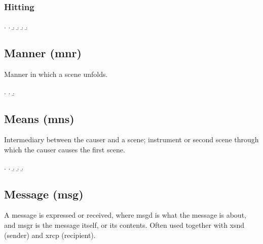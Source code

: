 \documentclass[a4paper]{article}
\begin{document}
\subsubsection{Hitting}

\ex.
\a. 
\b. 
\b. 
\b. 
\b. 


\clearpage
\subsection{Manner (\textsf{mnr})}
\label{sec:mnr}

Manner in which a scene unfolds.

\ex.
\a. 
\b. 


\clearpage
\subsection{Means (\textsf{mns})}
\label{sec:mns}

Intermediary between the causer and a scene; instrument or second scene through
which the causer causes the first scene.

\ex.
\a. 
\b. 
\b. 
\b. 


\clearpage
\subsection{Message (\textsf{msg})}
\label{sec:msg}

A message is expressed or received, where \textsf{msgd} is what the message is
about, and \textsf{msgr} is the message itself, or its contents. Often used
together with \textsf{xsnd} (sender) and \textsf{xrcp} (recipient).
\end{document}
